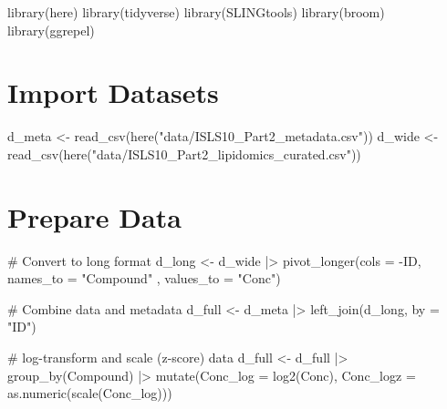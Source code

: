 \documentclass[
  letterpaper,
  DIV=11,
  numbers=noendperiod]{scrreprt}
\newenvironment{Shaded}{\begin{snugshade}}{\end{snugshade}}
\newcommand{\AttributeTok}[1]{\textcolor[rgb]{0.40,0.45,0.13}{#1}}
\newcommand{\CommentTok}[1]{\textcolor[rgb]{0.37,0.37,0.37}{#1}}
\newcommand{\FunctionTok}[1]{\textcolor[rgb]{0.28,0.35,0.67}{#1}}
\newcommand{\NormalTok}[1]{\textcolor[rgb]{0.00,0.23,0.31}{#1}}
\newcommand{\OtherTok}[1]{\textcolor[rgb]{0.00,0.23,0.31}{#1}}
\newcommand{\SpecialCharTok}[1]{\textcolor[rgb]{0.37,0.37,0.37}{#1}}
\newcommand{\StringTok}[1]{\textcolor[rgb]{0.13,0.47,0.30}{#1}}
\begin{document}
\begin{Shaded}
\begin{Highlighting}[]
\FunctionTok{library}\NormalTok{(here)}
\FunctionTok{library}\NormalTok{(tidyverse)}
\FunctionTok{library}\NormalTok{(SLINGtools)}
\FunctionTok{library}\NormalTok{(broom)}
\FunctionTok{library}\NormalTok{(ggrepel)}
\end{Highlighting}
\end{Shaded}

\hypertarget{import-datasets-2}{%
\section{Import Datasets}\label{import-datasets-2}}

\begin{Shaded}
\begin{Highlighting}[]
\NormalTok{d\_meta }\OtherTok{\textless{}{-}} \FunctionTok{read\_csv}\NormalTok{(}\FunctionTok{here}\NormalTok{(}\StringTok{"data/ISLS10\_Part2\_metadata.csv"}\NormalTok{))}
\NormalTok{d\_wide }\OtherTok{\textless{}{-}} \FunctionTok{read\_csv}\NormalTok{(}\FunctionTok{here}\NormalTok{(}\StringTok{"data/ISLS10\_Part2\_lipidomics\_curated.csv"}\NormalTok{))}
\end{Highlighting}
\end{Shaded}

\hypertarget{prepare-data-2}{%
\section{Prepare Data}\label{prepare-data-2}}

\begin{Shaded}
\begin{Highlighting}[]
\CommentTok{\# Convert to long format}
\NormalTok{d\_long }\OtherTok{\textless{}{-}}\NormalTok{ d\_wide }\SpecialCharTok{|\textgreater{}}
  \FunctionTok{pivot\_longer}\NormalTok{(}\AttributeTok{cols =} \SpecialCharTok{{-}}\NormalTok{ID, }\AttributeTok{names\_to =} \StringTok{"Compound"}\NormalTok{ , }\AttributeTok{values\_to =} \StringTok{"Conc"}\NormalTok{)}

\CommentTok{\# Combine data and metadata}
\NormalTok{d\_full }\OtherTok{\textless{}{-}}\NormalTok{ d\_meta }\SpecialCharTok{|\textgreater{}} \FunctionTok{left\_join}\NormalTok{(d\_long, }\AttributeTok{by =} \StringTok{"ID"}\NormalTok{)}

\CommentTok{\# log{-}transform and scale (z{-}score) data}
\NormalTok{d\_full }\OtherTok{\textless{}{-}}\NormalTok{ d\_full }\SpecialCharTok{|\textgreater{}}
  \FunctionTok{group\_by}\NormalTok{(Compound) }\SpecialCharTok{|\textgreater{}}
  \FunctionTok{mutate}\NormalTok{(}\AttributeTok{Conc\_log =} \FunctionTok{log2}\NormalTok{(Conc),}
         \AttributeTok{Conc\_logz =} \FunctionTok{as.numeric}\NormalTok{(}\FunctionTok{scale}\NormalTok{(Conc\_log)))}
\end{Highlighting}
\end{Shaded}
\end{document}

